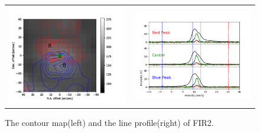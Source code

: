 \begin{figure}[h!]
	\begin{center}
		\begin{tabular}{cc}
			\includegraphics[width=7cm]{Orion_12CO2-1_FIR2_rbcontour_400_modified.png} &   \includegraphics[width=7cm]{Orion_12CO2-1_FIR2_line_profile_400.png} \\
		\end{tabular}
		\label{FIR221}
		\caption{The contour map(left) and the line profile(right) of FIR2. }
	\end{center}
\end{figure}

